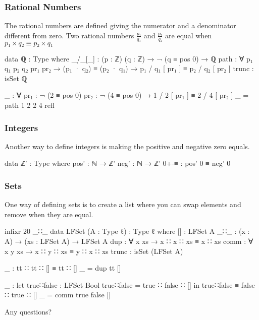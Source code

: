 \documentclass{beamer}
\begin{document}
\begin{frame}
  \frametitle{Rational Numbers}
  The rational numbers are defined giving the numerator and a denominator different from zero.
  Two rational numbers $ \frac{p₁}{q₁} $ and $ \frac{p₂}{q₂} $ are equal when $ p₁ \times q₂ \equiv p₂ \times q₁ $
  \begin{code}
  data ℚ : Type where
    _/_[_] : (p : ℤ) (q : ℤ) → ¬ (q ≡ pos 0) → ℚ
    path : ∀ p₁ q₁ p₂ q₂ {pr₁ pr₂} → (p₁ · q₂) ≡ (p₂ · q₁)
      → p₁ / q₁ [ pr₁ ] ≡ p₂ / q₂ [ pr₂ ]
    trunc : isSet ℚ

  _ : ∀ {pr₁ : ¬ (2 ≡ pos 0)} {pr₂ : ¬ (4 ≡ pos 0)}
    → 1 / 2 [ pr₁ ] ≡ 2 / 4 [ pr₂ ]
  _ = path 1 2 2 4 refl
  \end{code}
\end{frame}

\begin{frame}
  \frametitle{Integers}
  Another way to define integers is making the positive and negative zero equals.
  \begin{code}
  data ℤ' : Type where
    pos' : ℕ → ℤ'
    neg' : ℕ → ℤ'
    0+-≡ : pos' 0 ≡ neg' 0
  \end{code}
\end{frame}

\begin{frame}
  \frametitle{Sets}
  One way of defining sets is to create a list where you can swap elements and remove when they are equal.
  \begin{code}
  infixr 20 _∷_
  data LFSet (A : Type ℓ) : Type ℓ where
    []    : LFSet A
    _∷_   : (x : A) → (xs : LFSet A) → LFSet A
    dup   : ∀ x xs   → x ∷ x ∷ xs ≡ x ∷ xs
    comm  : ∀ x y xs → x ∷ y ∷ xs ≡ y ∷ x ∷ xs
    trunc : isSet (LFSet A)

  _ : tt ∷ tt ∷ [] ≡ tt ∷ []
  _ = dup tt []

  _ : let true∷false : LFSet Bool
          true∷false = true ∷ false ∷ []
      in true∷false ≡ false ∷ true ∷ []
  _ = comm true false []
  \end{code}
\end{frame}

\begin{frame}
  \vspace*{36 pt}
  \begin{center}
  {\Huge Any questions?}
  \end{center}
\end{frame}
\end{document}
